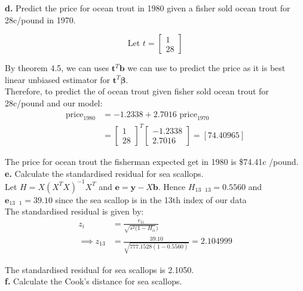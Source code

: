 \documentclass[12 pt, a4paper]{article}
\begin{document}
\noindent \textbf{d. } Predict the price for ocean trout in 1980 given a fisher sold ocean trout for 28c/pound in 1970.

\[ \text{Let } t= 
\begin{bmatrix}
1 \\ 28
\end{bmatrix}
\]

\noindent By theorem 4.5,  we can uses $\textbf{t}^T\textbf{b}$ we can use to predict the price as it is best linear unbiased estimator for $\textbf{t}^T\boldsymbol{\beta}$.\\
Therefore,  to predict the  of ocean trout given fisher sold ocean trout for 28c/pound and our model:
\begin{align*}
\text{price}_{1980} &= -1.2338+2.7016\text{ price}_{1970} \\
&= \begin{bmatrix}
1 \\ 28
\end{bmatrix}^T 
\begin{bmatrix}
-1.2338 \\ 2.7016
\end{bmatrix}
= [74.40965]
\end{align*}

The price for ocean trout the fisherman expected get in 1980 is \$74.41c /pound.   \\

\noindent \textbf{e.} Calculate the standardised residual for sea scallops.\\

\noindent Let $H=X(X^TX)^{-1}X^T$ and $\textbf{e}=\textbf{y}-X\textbf{b}$.  Hence $H_{13 \text{ }  13}=0.5560$ and $\textbf{e}_{13 \text{ }  1}=39.10$ since the sea scallop is in the 13th index of our data \\

\noindent The standardised residual is given by: \\
\begin{align*}
z_i&=\frac{e_{1i}}{\sqrt{s^2(1-H_{ii}})} \\
\implies z_{13}&=\frac{39.10}{\sqrt{777.1528(1-0.5560)}}=2.104999
\end{align*}

\noindent The standardised residual for sea scallops is 2.1050. \\

\noindent \textbf{f.} Calculate the Cook’s distance for sea scallops.\\
\end{document}
